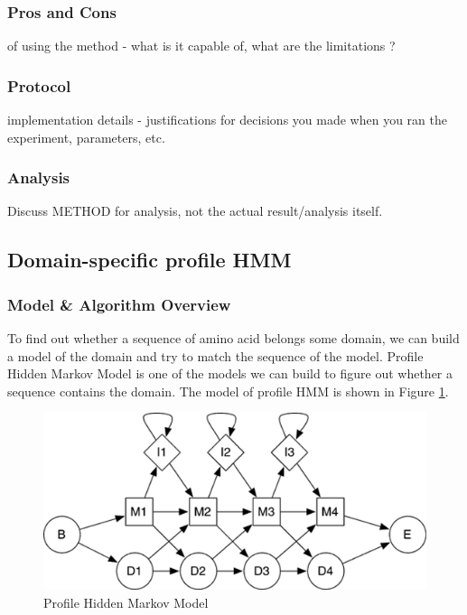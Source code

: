 \documentclass[11pt, oneside]{article}
\begin{document}
\medskip
\subsubsection{Pros and Cons}
of using the method - what is it capable of, what are the limitations ?

\medskip
\subsubsection{Protocol}
implementation details - justifications for decisions you made when you ran the experiment, parameters, etc.

\medskip
\subsubsection{Analysis}
Discuss METHOD for analysis, not the actual result/analysis itself. 

\bigskip
\subsection{Domain-specific profile HMM}
\medskip
\subsubsection{Model \& Algorithm Overview}
To find out whether a sequence of amino acid belongs some domain, we can build a model of the domain and try to match the sequence of the model. Profile Hidden Markov Model is one of the 
models we can build to figure out whether a sequence contains the domain. The model of profile HMM is shown in Figure \ref{HMM}. 

\begin{figure}[ht]
  \centering
  \includegraphics[scale = 0.7]{images/profileHMM}
      \caption{Profile Hidden Markov Model\cite{hmmer}}
      \label{HMM}
\end{figure}
\end{document}
